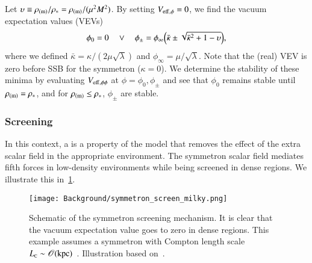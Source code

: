     Let $\upsilon\equiv\rho_\mathrm{(m)}/\rho_\ast = \rho_\mathrm{(m)}/(\mu^2M^2)$. By setting $V_\mathrm{eff,\phi}=0$, we find the vacuum expectation values (VEVs)
    \begin{equation}
        \phi_0 = 0 \quad \lor \quad \phi_\pm = \phi_\infty \pclosed{\bar{\kappa} \pm  \sqrt{\bar{\kappa}^2 +  1- \upsilon }},%
    \end{equation}
    where we defined $\bar{\kappa} = \kappa / (2\mu \sqrt{\lambda}) $ and $\phi_\infty = \mu/\sqrt{\lambda}$. Note that the (real) VEV is zero before SSB for the symmetron ($\kappa=0$).
    We determine the stability of these minima by evaluating $V_\mathrm{eff,\phi\phi}$ at $\phi=\phi_0,\phi_\pm$ and see that $\phi_0$ remains stable until $\rho_\mathrm{(m)}=\rho_\ast$, and for $\rho_\mathrm{(m)}\leq \rho_\ast$, $\phi_\pm$ are stable. %


    \subsubsection{Screening}
    In this context, a  is a property of the model that removes the effect of the extra scalar field in the appropriate environment. The symmetron scalar field mediates fifth forces in low-density environments while being screened in dense regions. We illustrate this in~\cref{fig:cosmo:quintessence:symmetron_screen_milky}. 

    \begin{figure}[h]
        \centering
        {\texttt{[image: Background/symmetron\_screen\_milky.png]}}
        {\caption{Schematic of the symmetron screening mechanism. It is clear that the vacuum expectation value goes to zero in dense regions. This example assumes a symmetron with Compton length scale $L_{\text{\tiny{C}}}\sim\mathscr{O}(\mathrm{kpc})$~\citep{burrageAccurateComputationScreening2024}. Illustration based on~\citet{christiansenCosmologicalSimulationsPhase2024}.}
        \label{fig:cosmo:quintessence:symmetron_screen_milky}}
    \end{figure}

